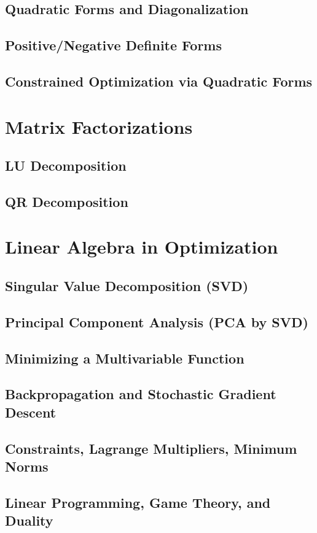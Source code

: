 \documentclass[11pt]{article}
\begin{document}
\subsection{Quadratic Forms and Diagonalization}
\subsection{Positive/Negative Definite Forms}
\subsection{Constrained Optimization via Quadratic Forms}

\section{Matrix Factorizations}
\subsection{LU Decomposition}
\subsection{QR Decomposition}

\section{Linear Algebra in Optimization}
\subsection{Singular Value Decomposition (SVD)}
\subsection{Principal Component Analysis (PCA by SVD)}
\subsection{Minimizing a Multivariable Function}
\subsection{Backpropagation and Stochastic Gradient Descent}
\subsection{Constraints, Lagrange Multipliers, Minimum Norms}
\subsection{Linear Programming, Game Theory, and Duality}
\end{document}
